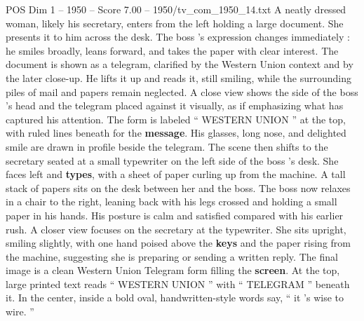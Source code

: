 \begin{textsample}{POS Dim 1 – 1950 – Score 7.00 – 1950/tv\_com\_1950\_14.txt}
A neatly dressed woman, likely his secretary, enters from the left holding a large document.
She presents it to him across the desk.
The boss ’s expression changes immediately : he smiles broadly, leans forward, and takes the paper with clear interest.
The document is shown as a telegram, clarified by the Western Union context and by the later close-up.
He lifts it up and reads it, still smiling, while the surrounding piles of mail and papers remain neglected.
A close view shows the side of the boss ’s head and the telegram placed against it visually, as if emphasizing what has captured his attention.
The form is labeled “ WESTERN UNION ” at the top, with ruled lines beneath for the \textbf{message}.
His glasses, long nose, and delighted smile are drawn in profile beside the telegram.
The scene then shifts to the secretary seated at a small typewriter on the left side of the boss ’s desk.
She faces left and \textbf{types}, with a sheet of paper curling up from the machine.
A tall stack of papers sits on the desk between her and the boss.
The boss now relaxes in a chair to the right, leaning back with his legs crossed and holding a small paper in his hands.
His posture is calm and satisfied compared with his earlier rush.
A closer view focuses on the secretary at the typewriter.
She sits upright, smiling slightly, with one hand poised above the \textbf{keys} and the paper rising from the machine, suggesting she is preparing or sending a written reply.
The final image is a clean Western Union Telegram form filling the \textbf{screen}.
At the top, large printed text reads “ WESTERN UNION ” with “ TELEGRAM ” beneath it.
In the center, inside a bold oval, handwritten-style words say, “ it ’s wise to wire. ”

\end{textsample}
